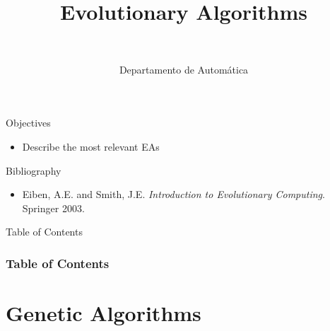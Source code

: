\documentclass[10pt,compress]{beamer} %
\title[Evolutionary Algorithms]{Evolutionary Algorithms}
\author{\asignatura\\\carrera}
\institute{}
\date{Departamento de Automática}
\begin{document}
{\titlepageBlue
    \begin{frame}
        \titlepage
    \end{frame}
}

\institute{\asignatura}

\begin{frame}[plain]{}
   \begin{block}{Objectives}
       \begin{itemize}
        \item Describe the most relevant EAs
       \end{itemize}
   \end{block}

   \begin{block}{Bibliography}
    \begin{itemize}
         \item Eiben, A.E. and Smith, J.E. \emph{Introduction to Evolutionary Computing}. Springer 2003.
	\end{itemize}
   \end{block}
\end{frame}

{
\begin{frame}[shrink]{Table of Contents}
 \frametitle{Table of Contents}
 \tableofcontents
\end{frame}
}

\section{Genetic Algorithms}
\end{document}
